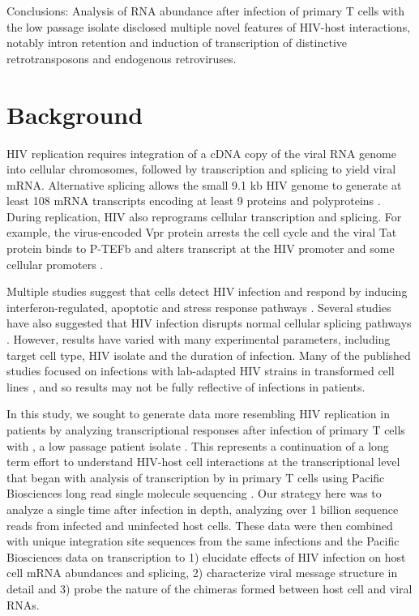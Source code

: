 \documentclass[../sherrill-Mix_thesis.tex]{subfiles}
\begin{document}
	Conclusions: Analysis of RNA abundance after infection of primary T cells with the low passage \hivEight{} isolate disclosed multiple novel features of HIV-host interactions, notably intron retention and induction of transcription of distinctive retrotransposons and endogenous retroviruses.

\section{Background}
	HIV replication requires integration of a cDNA copy of the viral RNA genome into cellular chromosomes, followed by transcription and splicing to yield viral mRNA. Alternative splicing allows the small 9.1 kb HIV genome to generate at least 108 mRNA transcripts encoding at least 9 proteins and polyproteins  \citep{Wain-Hobson1985,Arya1985,Schwartz1990,Purcell1993,Stoltzfus2009,Ocwieja2012}. During replication, HIV also reprograms cellular transcription and splicing. For example, the virus-encoded Vpr protein arrests the cell cycle \citep{He1995,Jowett1995,Rogel1995,Goh1998} and the viral Tat protein binds to P-TEFb and alters transcript at the HIV promoter and some cellular promoters \citep{Marciniak1991,Wei1998,Kanazawa2000,Barboric2007,OBrien2010,Muniz2010}. 

	Multiple studies suggest that cells detect HIV infection and respond by inducing inter\-feron-regulated, apoptotic and stress response pathways \citep{Corbeil2001,Woelk2004,Hyrcza2007,Wu2008,Smith2010,Chang2011,Imbeault2012,Mohammadi2013,Peng2014}. Several studies have also suggested that HIV infection disrupts normal cellular splicing pathways \citep{Dowling2008,Peng2014}. However, results have varied with many experimental parameters, including target cell type, HIV isolate and the duration of infection. Many of the published studies focused on infections with lab-adapted HIV strains in transformed cell lines \citep{Corbeil2001,Mitchell2003,delaFuente2002,Chang2011,Lefebvre2011,Peng2014}, and so results may not be fully reflective of infections in patients.

	In this study, we sought to generate data more resembling HIV replication in patients by analyzing transcriptional responses after infection of primary T cells with \hivEight{}, a low passage patient isolate \citep{Collman1992}.  This represents a continuation of a long term effort to understand HIV-host cell interactions at the transcriptional level that began with analysis of transcription by \hivEight{} in primary T cells using Pacific Biosciences long read single molecule sequencing \citep{Ocwieja2012}. Our strategy here was to analyze a single time after infection in depth, analyzing over 1 billion sequence reads from \hivEight{} infected and uninfected host cells. These data were then combined with \nIntegrations{} unique integration site sequences from the same infections and the Pacific Biosciences data on \hivEight{} transcription to 1) elucidate effects of HIV infection on host cell mRNA abundances and splicing, 2) characterize viral message structure in detail and 3) probe the nature of the chimeras formed between host cell and viral RNAs.  
\end{document}
